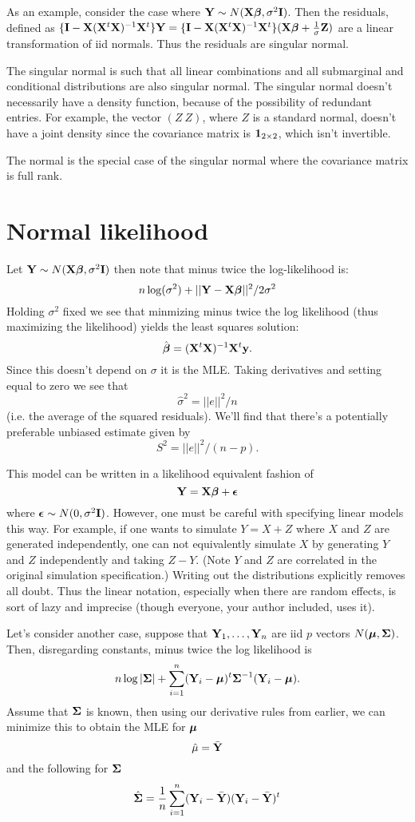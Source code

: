 As an example, consider the case where $\mathbf{Y} \sim N(\mathbf{X} \boldsymbol{\beta}, \sigma^2 \mathbf{I})$.
Then the residuals, defined as $\{\mathbf{I} - \mathbf{X} (\mathbf{X}^t \mathbf{X})^{-1} \mathbf{X}^t\} \mathbf{Y} = \{\mathbf{I} - \mathbf{X} (\mathbf{X}^t \mathbf{X})^{-1} \mathbf{X}^t\}(\mathbf{X}\boldsymbol{\beta} + \frac{1}{\sigma} \mathbf{Z})$
are a linear transformation of iid normals. Thus the residuals are singular normal. 

The singular normal is such that all linear combinations and all submarginal and conditional distributions
are also singular normal. The singular normal doesn't necessarily
have a density function, because of the possibility of redundant
entries. For example, the vector $(Z ~ Z)$, where $Z$ is a standard normal,
doesn't have a joint density since the covariance matrix is $\mathbf{1}_{2\times 2}$,
which isn't invertible.

The normal is the special case of the singular normal where the covariance
matrix is full rank. 

\section{Normal likelihood}

Let $\mathbf{Y} \sim N(\mathbf{X} \boldsymbol{\beta}, \sigma^2 \mathbf{I})$ then note that 
minus twice the log-likelihood is:
$$
n\log(\sigma^2) + ||\mathbf{Y} - \mathbf{X} \boldsymbol{\beta}||^2 / 2\sigma^2
$$
Holding $\sigma^2$ fixed we see that minmizing minus twice
the log likelihood (thus maximizing the likelihood) yields
the least squares solution:
$$
\hat {\boldsymbol{\beta}} = (\mathbf{X}^t \mathbf{X})^{-1} \mathbf{X}^t \mathbf{y}.
$$
Since this doesn't depend on $\sigma$ it is the MLE. 
Taking derivatives and setting equal to zero we
see that 
$$
\hat \sigma^2 = ||e||^2 / n
$$
(i.e. the average of the squared residuals). We'll
find that there's a potentially preferable unbiased
estimate given by
$$
S^2 = ||e||^2 / (n - p).
$$

This model can be written in a  likelihood equivalent fashion
of  
$$
\mathbf{Y} = \mathbf{X} \boldsymbol{\beta} + \boldsymbol{\epsilon}
$$
where $\boldsymbol{\epsilon} \sim N(0, \sigma^2 \mathbf{I})$. However, one
must be careful with specifying linear models this way.
For example, if one wants to simulate $Y = X + Z$ where $X$ and $Z$ are generated
independently, one can not equivalently simulate $X$
by generating $Y$ and $Z$ independently and taking $Z - Y$.
(Note $Y$ and $Z$ are correlated in the original simulation specification.)
Writing out the distributions explicitly removes all doubt. 
Thus the linear notation, especially when there are random effects, is sort
of lazy and imprecise (though everyone, your author included, uses it). 


Let's consider another case, suppose that $\mathbf{Y}_1, \ldots, \mathbf{Y}_n$ are iid $p$ vectors
$N(\boldsymbol{\mu}, \boldsymbol{\Sigma})$. Then, disregarding constants, minus twice the log likelihood is
$$
n \log|\boldsymbol{\Sigma}| + \sum_{i=1}^n (\mathbf{Y}_i - \boldsymbol{\mu})^t \boldsymbol{\Sigma}^{-1} (\mathbf{Y}_i - \boldsymbol{\mu}).
$$
Assume that $\boldsymbol{\Sigma}$ is known, then using our derivative rules from earlier,
we can minimize this to obtain the MLE for $\boldsymbol{\mu}$
$$
\hat \mu = \bar {\mathbf{Y}} 
$$
and the following for $\boldsymbol{\Sigma}$
$$
\hat {\boldsymbol{\Sigma}} = \frac{1}{n} \sum_{i=1}^n (\mathbf{Y}_i - \bar {\mathbf{Y}}) (\mathbf{Y}_i -\bar {\mathbf{Y}})^t
$$



